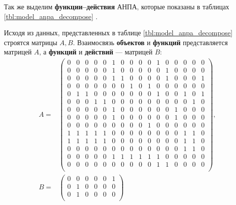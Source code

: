 Так же выделим \textbf{функции--действия} АНПА, которые показаны в таблицах
\ref{tbl:model_anpa_decompose} \cite{journal:vestnik_igeu:elizarova}.
%

%
Исходя из данных, представленных в таблице \ref{tbl:model_anpa_decompose}
строятся матрицы $A, B$.
Взаимосвязь \textbf{объектов} и \textbf{функций} представляется матрицей $A$,
а \textbf{функций} и \textbf{действий} --- матрицей $B$:
%
\begin{equation}\label{eq:matrix_ab}
    \begin{split}
    A = &\begin{pmatrix}
        0 & 0 & 0 & 0 & 0 & 1 & 0 & 0 & 0 & 0 & 1 & 0 & 0 & 0 & 0 & 0 \\
        0 & 0 & 0 & 0 & 0 & 1 & 0 & 0 & 0 & 0 & 0 & 1 & 0 & 0 & 0 & 0 \\
        0 & 0 & 0 & 0 & 0 & 1 & 1 & 0 & 0 & 0 & 0 & 1 & 0 & 0 & 0 & 1 \\
        0 & 0 & 0 & 0 & 0 & 0 & 0 & 1 & 0 & 1 & 0 & 0 & 0 & 0 & 0 & 0 \\
        0 & 1 & 1 & 0 & 0 & 0 & 0 & 0 & 0 & 0 & 1 & 0 & 0 & 1 & 0 & 1 \\
        0 & 0 & 0 & 1 & 1 & 0 & 0 & 0 & 0 & 0 & 0 & 0 & 0 & 0 & 1 & 0 \\
        0 & 0 & 0 & 0 & 0 & 1 & 0 & 0 & 0 & 0 & 0 & 0 & 1 & 0 & 0 & 0 \\
        0 & 0 & 0 & 0 & 0 & 1 & 0 & 0 & 0 & 0 & 0 & 0 & 1 & 0 & 0 & 0 \\
        0 & 0 & 0 & 0 & 0 & 0 & 0 & 0 & 0 & 1 & 0 & 0 & 0 & 0 & 0 & 0 \\
        1 & 1 & 1 & 1 & 1 & 0 & 0 & 0 & 0 & 0 & 0 & 0 & 0 & 1 & 1 & 0 \\
        1 & 1 & 1 & 1 & 1 & 0 & 0 & 0 & 0 & 0 & 0 & 0 & 0 & 1 & 1 & 0 \\
        0 & 0 & 0 & 0 & 0 & 0 & 0 & 0 & 0 & 0 & 0 & 0 & 0 & 1 & 1 & 0 \\
        0 & 0 & 0 & 0 & 0 & 1 & 1 & 1 & 1 & 1 & 1 & 0 & 0 & 0 & 0 & 0 \\
        0 & 0 & 0 & 0 & 0 & 0 & 0 & 0 & 0 & 0 & 1 & 1 & 0 & 0 & 0 & 0 \\
    \end{pmatrix},{}\\
%
    B = &\begin{pmatrix}
        0 & 0 & 0 & 0 & 0 & 1 \\
        0 & 1 & 0 & 0 & 0 & 0 \\
        0 & 1 & 0 & 0 & 0 & 0 \\

\end{pmatrix}
\end{split}
\end{equation}
